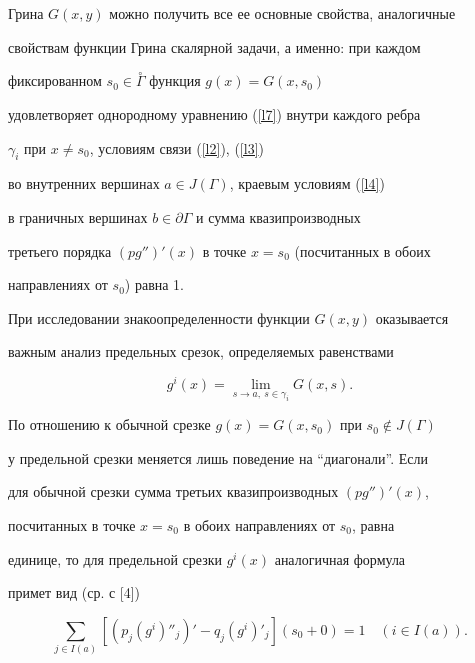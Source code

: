{{{{{{{Грина $G(x,y)$ можно получить все ее основные свойства, аналогичные


свойствам функции Грина скалярной задачи, а именно: при каждом


фиксированном $s_0 \in \overset{\circ}{\Gamma}$ функция $g(x)=G(x,s_0)$


удовлетворяет однородному уравнению (\ref{l7}) внутри каждого ребра


$\gamma_i$ при $x \ne s_0$, условиям связи (\ref{l2}), (\ref{l3})


во внутренних вершинах $a \in J(\Gamma)$, краевым условиям (\ref{l4})


в граничных вершинах $b \in \partial \Gamma$ и сумма квазипроизводных


третьего порядка $(pg'')'(x)$ в точке $x=s_0$ (посчитанных в обоих


направлениях от $s_0$) равна 1.





При исследовании знакоопределенности функции $G(x,y)$ оказывается


важным анализ предельных срезок, определяемых равенствами


\begin{equation}


\label{l13}


g^i (x)=\lim_{s \to a,\ s \in \gamma_i}G(x,s).


\end{equation}





По отношению к обычной срезке $g(x)=G(x,s_0)$ при $s_0 \notin J(\Gamma)$


у предельной срезки меняется лишь поведение на ``диагонали''. Если


для обычной срезки сумма третьих квазипроизводных $(pg'')'(x)$,


посчитанных в точке $x=s_0$ в обоих направлениях от $s_0$, равна


единице, то для предельной срезки $g^i (x)$ аналогичная формула


примет вид (ср. с [4])


\begin{equation}


\label{l14}


\sum_{j \in I(a)}[ (p_j(g^i)''_{j})'-q_j(g^i)'_{j}]


(s_0+0)=1 \quad (i \in I(a)).


\end{equation}





}}}}}}}
